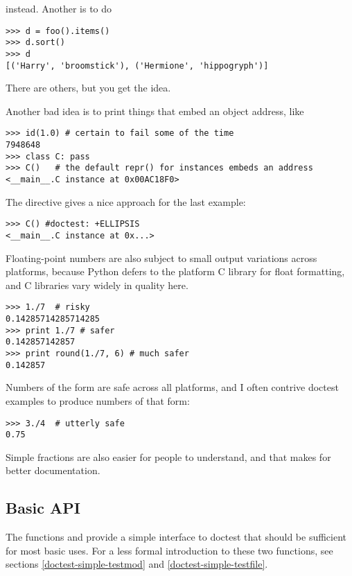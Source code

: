instead.  Another is to do

\begin{verbatim}
>>> d = foo().items()
>>> d.sort()
>>> d
[('Harry', 'broomstick'), ('Hermione', 'hippogryph')]
\end{verbatim}

There are others, but you get the idea.

Another bad idea is to print things that embed an object address, like

\begin{verbatim}
>>> id(1.0) # certain to fail some of the time
7948648
>>> class C: pass
>>> C()   # the default repr() for instances embeds an address
<__main__.C instance at 0x00AC18F0>
\end{verbatim}

The  directive gives a nice approach for the last
example:

\begin{verbatim}
>>> C() #doctest: +ELLIPSIS
<__main__.C instance at 0x...>
\end{verbatim}

Floating-point numbers are also subject to small output variations across
platforms, because Python defers to the platform C library for float
formatting, and C libraries vary widely in quality here.

\begin{verbatim}
>>> 1./7  # risky
0.14285714285714285
>>> print 1./7 # safer
0.142857142857
>>> print round(1./7, 6) # much safer
0.142857
\end{verbatim}

Numbers of the form  are safe across all platforms, and I
often contrive doctest examples to produce numbers of that form:

\begin{verbatim}
>>> 3./4  # utterly safe
0.75
\end{verbatim}

Simple fractions are also easier for people to understand, and that makes
for better documentation.

\subsection{Basic API\label{doctest-basic-api}}

The functions  and  provide a
simple interface to doctest that should be sufficient for most basic
uses.  For a less formal introduction to these two functions, see
sections \ref{doctest-simple-testmod} and
\ref{doctest-simple-testfile}.

